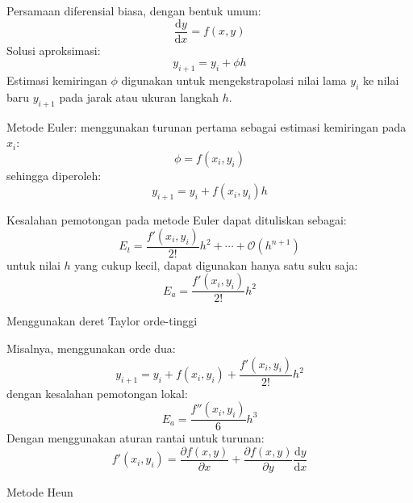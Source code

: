 Persamaan diferensial biasa, dengan bentuk umum:
\begin{equation*}
\frac{\mathrm{d}y}{\mathrm{d}x} = f(x,y)
\end{equation*}
Solusi aproksimasi:
\begin{equation*}
y_{i+1} = y_{i} + \phi h
\end{equation*}
Estimasi kemiringan $\phi$ digunakan untuk mengekstrapolasi nilai lama
$y_{i}$ ke nilai baru $y_{i+1}$ pada jarak atau ukuran langkah $h$.

Metode Euler: menggunakan turunan pertama sebagai estimasi kemiringan pada
$x_i$:
\begin{equation*}
\phi = f(x_i, y_i)
\end{equation*}
sehingga diperoleh:
\begin{equation*}
y_{i+1} = y_{i} + f(x_i, y_i) h
\end{equation*}

Kesalahan pemotongan pada metode Euler dapat dituliskan sebagai:
\begin{equation*}
E_{t} = \frac{f'(x_i, y_i)}{2!} h^2 + \cdots + \mathcal{O}(h^{n+1})
\end{equation*}
untuk nilai $h$ yang cukup kecil, dapat digunakan hanya satu suku saja:
\begin{equation*}
E_{a} = \frac{f'(x_i, y_i)}{2!} h^2
\end{equation*}

Menggunakan deret Taylor orde-tinggi

Misalnya, menggunakan orde dua:
\begin{equation*}
y_{i+1} = y_{i} + f(x_i, y_i) + \frac{f'(x_i, y_i)}{2!}h^2
\end{equation*}
dengan kesalahan pemotongan lokal:
\begin{equation*}
E_{a} = \frac{f''(x_i, y_i)}{6} h^3
\end{equation*}
Dengan menggunakan aturan rantai untuk turunan:
\begin{equation*}
f'(x_i, y_i) = \frac{\partial f(x,y)}{\partial x} +
\frac{\partial f(x,y)}{\partial y}\frac{\mathrm{d}y}{\mathrm{d}x}
\end{equation*}

Metode Heun

